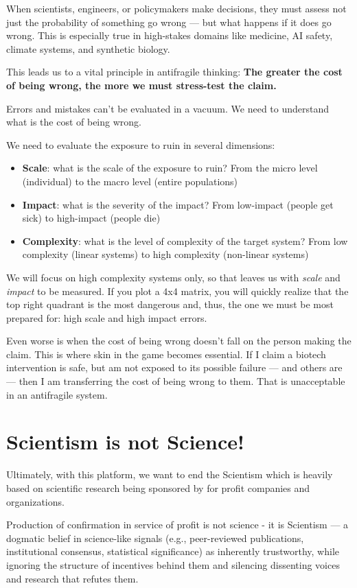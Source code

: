 When scientists, engineers, or policymakers make decisions, they must assess not just the probability of something go wrong — but what happens if 
it does go wrong. This is especially true in high-stakes domains like medicine, AI safety, climate systems, and synthetic biology.

This leads us to a vital principle in antifragile thinking: \textbf{The greater the cost of being wrong, the more we must stress-test the claim.}

Errors and mistakes can't be evaluated in a vacuum. We need to understand what is the cost of being wrong. 

We need to evaluate the exposure to ruin in several dimensions:

\begin{itemize}
	\item \textbf{Scale}: what is the scale of the exposure to ruin? From the micro level (individual) to the macro level (entire populations)
	\item \textbf{Impact}: what is the severity of the impact? From low-impact (people get sick) to high-impact (people die)
	\item \textbf{Complexity}: what is the level of complexity of the target system? From low complexity (linear systems) to high complexity (non-linear systems)
\end{itemize}

We will focus on high complexity systems only, so that leaves us with \textit{scale} and \textit{impact} to be measured.
If you plot a 4x4 matrix, you will quickly realize that the top right quadrant is the most dangerous and, thus, the one we must be most prepared for: high scale and high impact errors.

Even worse is when the cost of being wrong doesn't fall on the person making the claim. This is where skin in the game becomes essential. If I claim a biotech intervention is safe, but am not exposed to its possible failure — and others are — then I am transferring the cost of being wrong to them. That is unacceptable in an antifragile system.

\section{Scientism is not Science!}
Ultimately, with this platform, we want to end the Scientism which is heavily based on scientific research being sponsored by for profit companies and organizations.

Production of confirmation in service of profit is not science - it is Scientism — a dogmatic belief in science-like signals (e.g., peer-reviewed publications, institutional consensus, statistical significance) as inherently trustworthy, while ignoring the structure of incentives behind them and silencing dissenting voices and research that refutes them.

